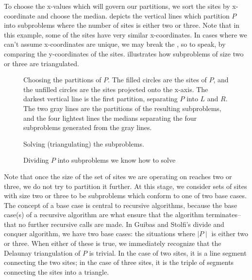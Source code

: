 \documentclass[12pt,twoside]{reedthesis}
\begin{document}
    To choose the x-values which will govern our partitions, we sort the sites by x-coordinate and choose the median.  depicts the vertical lines which partition $P$ into subproblems where the number of sites is either two or three.  Note that in this example, some of the sites have very similar x-coordinates. In cases where we can't assume x-coordinates are unique, we may break the , so to speak, by comparing the y-coordinates of the sites.  illustrates how subproblems of size two or three are triangulated. \par 
    \begin{figure}[!htb]
    \centering
      \begin{subtable}{\textwidth}
        \centering
        
        \caption{Choosing the partitions of $P$. The filled circles are the sites of $P$, and the unfilled circles are the sites projected onto the x-axis. The darkest vertical line is the first partition, separating $P$ into $L$ and $R$. The two gray lines are the partitions of the resulting subproblems, and the four lightest lines the medians separating the four subproblems generated from the gray lines.}
        \label{fig:del_partition0}
      \end{subtable}

      \begin{subtable}{\textwidth}
        \centering
        
        \caption{Solving (triangulating) the subproblems.}
        \label{fig:del_partition1}
      \end{subtable}
      \caption{Dividing $P$ into subproblems we know how to solve}
      \label{fig:div_and_triangulate}
    \end{figure}

    Note that once the size of the set of sites we are operating on reaches two or three, we do not try to partition it further. At this stage, we consider sets of sites with size two or three to be subproblems which conform to one of two base cases. The concept of a base case is central to recursive algorithms, because the base case(s) of a recursive algorithm are what ensure that the algorithm terminates-- that no further recursive calls are made. In Guibas and Stolfi's divide and conquer algorithm, we have two base cases: the situations where $\mid P\mid$ is either two or three. When either of these is true, we immediately recognize that the Delaunay triangulation of $P$ is trivial. In the case of two sites, it is a line segment connecting the two sites; in the case of three sites, it is the triple of segments connecting the sites into a triangle.\par
\end{document}
